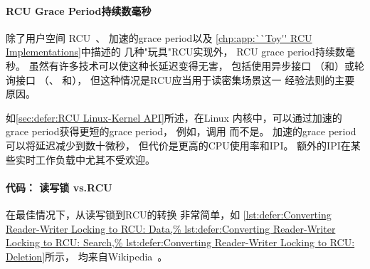 \QuickQuizEnd

\paragraph{RCU Grace Period持续数毫秒}

除了用户空间
RCU~\cite{MathieuDesnoyers2009URCU,PaulMcKenney2013LWNURCU}、
加速的grace period以及
\cref{chp:app:``Toy'' RCU Implementations}中描述的
几种"玩具"RCU实现外，
RCU grace period持续数毫秒。
虽然有许多技术可以使这种长延迟变得无害，
包括使用异步接口
（和）或轮询接口
（、
和），
但这种情况是RCU应当用于读密集场景这一
经验法则的主要原因。

如\cref{sec:defer:RCU Linux-Kernel API}所述，在Linux
内核中，可以通过加速的grace period获得更短的grace period，
例如，调用
而不是。
加速的grace period可以将延迟减少到数十微秒，
但代价是更高的CPU使用率和IPI。
额外的IPI在某些实时工作负载中尤其不受欢迎。

\paragraph{代码：
		 读写锁 vs.\@ RCU}

在最佳情况下，从读写锁到RCU的转换
非常简单，如
\cref{lst:defer:Converting Reader-Writer Locking to RCU: Data,%
lst:defer:Converting Reader-Writer Locking to RCU: Search,%
lst:defer:Converting Reader-Writer Locking to RCU: Deletion}所示，
均来自Wikipedia~\cite{WikipediaRCU}。


